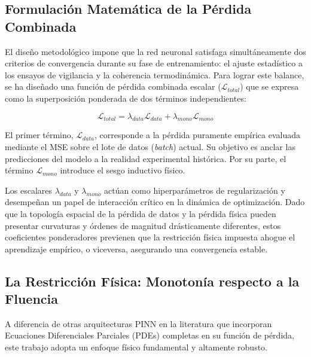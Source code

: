\documentclass[a4paper, 12pt, twocolumn]{book}
\begin{document}
\subsection{Formulación Matemática de la Pérdida Combinada}

El diseño metodológico impone que la red neuronal satisfaga simultáneamente dos criterios de convergencia durante su fase de entrenamiento: el ajuste estadístico a los ensayos de vigilancia y la coherencia termodinámica. Para lograr este balance, se ha diseñado una función de pérdida combinada escalar ($\mathcal{L}_{total}$) que se expresa como la superposición ponderada de dos términos independientes:

\begin{equation}
    \mathcal{L}_{total} = \lambda_{data}\mathcal{L}_{data} + \lambda_{mono}\mathcal{L}_{mono}
\end{equation}

El primer término, $\mathcal{L}_{data}$, corresponde a la pérdida puramente empírica evaluada mediante el MSE sobre el lote de datos (\textit{batch}) actual. Su objetivo es anclar las predicciones del modelo a la realidad experimental histórica. Por su parte, el término $\mathcal{L}_{mono}$ introduce el sesgo inductivo físico. 

Los escalares $\lambda_{data}$ y $\lambda_{mono}$ actúan como hiperparámetros de regularización y desempeñan un papel de interacción crítico en la dinámica de optimización. Dado que la topología espacial de la pérdida de datos y la pérdida física pueden presentar curvaturas y órdenes de magnitud drásticamente diferentes, estos coeficientes ponderadores previenen que la restricción física impuesta ahogue el aprendizaje empírico, o viceversa, asegurando una convergencia estable.

\subsection{La Restricción Física: Monotonía respecto a la Fluencia}

A diferencia de otras arquitecturas PINN en la literatura que incorporan Ecuaciones Diferenciales Parciales (PDEs) completas en su función de pérdida, este trabajo adopta un enfoque físico fundamental y altamente robusto. 
\end{document}
